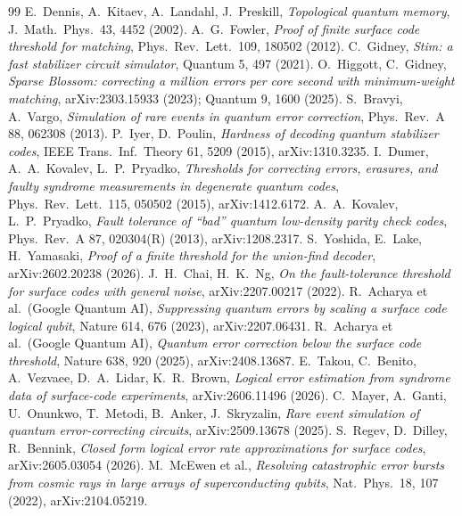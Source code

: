 \documentclass[11pt]{article}
\theoremstyle{plain}
\theoremstyle{definition}
\theoremstyle{remark}
\renewcommand{\_}{\oldunderscore\allowbreak}
\begin{document}
\begin{thebibliography}{99}
 E.~Dennis, A.~Kitaev, A.~Landahl, J.~Preskill, \emph{Topological quantum memory}, J.\ Math.\ Phys.\ 43, 4452 (2002).
 A.~G.~Fowler, \emph{Proof of finite surface code threshold for matching}, Phys.\ Rev.\ Lett.\ 109, 180502 (2012).
 C.~Gidney, \emph{Stim: a fast stabilizer circuit simulator}, Quantum 5, 497 (2021).
 O.~Higgott, C.~Gidney, \emph{Sparse Blossom: correcting a million errors per core second with minimum-weight matching}, arXiv:2303.15933 (2023); Quantum 9, 1600 (2025).
 S.~Bravyi, A.~Vargo, \emph{Simulation of rare events in quantum error correction}, Phys.\ Rev.\ A 88, 062308 (2013).
 P.~Iyer, D.~Poulin, \emph{Hardness of decoding quantum stabilizer codes}, IEEE Trans.\ Inf.\ Theory 61, 5209 (2015), arXiv:1310.3235.
 I.~Dumer, A.~A.~Kovalev, L.~P.~Pryadko, \emph{Thresholds for correcting errors, erasures, and faulty syndrome measurements in degenerate quantum codes}, Phys.\ Rev.\ Lett.\ 115, 050502 (2015), arXiv:1412.6172.
 A.~A.~Kovalev, L.~P.~Pryadko, \emph{Fault tolerance of ``bad'' quantum low-density parity check codes}, Phys.\ Rev.\ A 87, 020304(R) (2013), arXiv:1208.2317.
 S.~Yoshida, E.~Lake, H.~Yamasaki, \emph{Proof of a finite threshold for the union-find decoder}, arXiv:2602.20238 (2026).
 J.~H.~Chai, H.~K.~Ng, \emph{On the fault-tolerance threshold for surface codes with general noise}, arXiv:2207.00217 (2022).
 R.~Acharya et al.\ (Google Quantum AI), \emph{Suppressing quantum errors by scaling a surface code logical qubit}, Nature 614, 676 (2023), arXiv:2207.06431.
 R.~Acharya et al.\ (Google Quantum AI), \emph{Quantum error correction below the surface code threshold}, Nature 638, 920 (2025), arXiv:2408.13687.
 E.~Takou, C.~Benito, A.~Vezvaee, D.~A.~Lidar, K.~R.~Brown, \emph{Logical error estimation from syndrome data of surface-code experiments}, arXiv:2606.11496 (2026).
 C.~Mayer, A.~Ganti, U.~Onunkwo, T.~Metodi, B.~Anker, J.~Skryzalin, \emph{Rare event simulation of quantum error-correcting circuits}, arXiv:2509.13678 (2025).
 S.~Regev, D.~Dilley, R.~Bennink, \emph{Closed form logical error rate approximations for surface codes}, arXiv:2605.03054 (2026).
 M.~McEwen et al., \emph{Resolving catastrophic error bursts from cosmic rays in large arrays of superconducting qubits}, Nat.\ Phys.\ 18, 107 (2022), arXiv:2104.05219.

\end{thebibliography}
\end{document}
